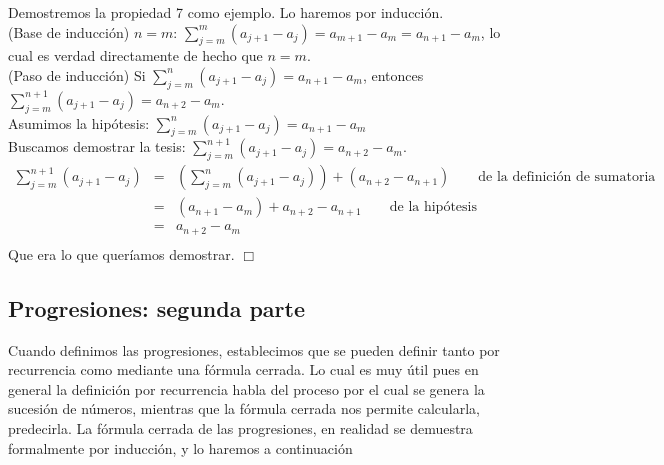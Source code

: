 Demostremos la propiedad 7 como ejemplo. Lo haremos por inducción.\\
(Base de inducción) $n=m$: ${\displaystyle \sum_{j=m}^m (a_{j+1}-a_j)=a_{m+1}-a_m=a_{n+1}-a_m}$, lo cual es verdad directamente de hecho que $n=m$.\\
(Paso de inducción) Si ${\displaystyle \sum_{j=m}^n (a_{j+1}-a_j)=a_{n+1}-a_m}$, entonces ${\displaystyle \sum_{j=m}^{n+1} (a_{j+1}-a_j)=a_{n+2}-a_m}$.\\
Asumimos la hipótesis: ${\displaystyle \sum_{j=m}^n (a_{j+1}-a_j)=a_{n+1}-a_m}$\\
Buscamos demostrar la tesis: ${\displaystyle \sum_{j=m}^{n+1} (a_{j+1}-a_j)=a_{n+2}-a_m}$.\\
\begin{eqnarray*}
  \sum_{j=m}^{n+1} (a_{j+1}-a_j)&=& \left(\sum_{j=m}^{n} (a_{j+1}-a_j)\right) +(a_{n+2}-a_{n+1})\qquad \textrm{de la definición de sumatoria}\\
  &=& \left(a_{n+1}-a_m\right) +a_{n+2}-a_{n+1}\qquad \textrm{de la hipótesis}\\
  &=&a_{n+2} -a_m\\
\end{eqnarray*}
Que era lo que queríamos demostrar.
\hfill $\Box$

\subsection{Progresiones: segunda parte}


Cuando definimos las progresiones, establecimos que se pueden definir tanto por recurrencia como mediante una fórmula cerrada. Lo cual es muy útil pues en general la definición por recurrencia habla del proceso por el cual se genera la sucesión de números, mientras que la fórmula cerrada nos permite calcularla, predecirla.
La fórmula cerrada de las progresiones, en realidad se demuestra formalmente por inducción, y lo haremos a continuación

\medskip

